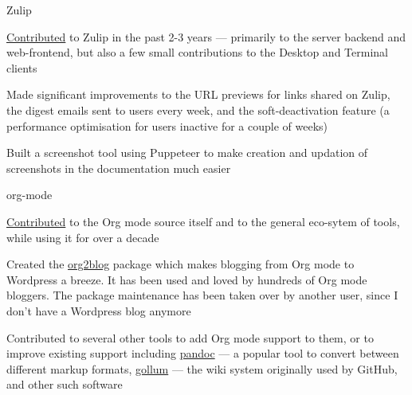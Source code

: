 
\begin{cventries}

  \cventry
      {Zulip }
      {}
      {} %
      {} %
      {
        \begin{cvitems} %
        \item {\href{https://github.com/zulip/zulip/commits?author=punchagan}{Contributed} to Zulip in the past 2-3 years --- primarily to the server backend and web-frontend, but also a few small contributions to the Desktop and Terminal clients}
        \item {Made significant improvements to the URL previews for links shared on Zulip, the digest emails sent to users every week, and the soft-deactivation feature (a performance optimisation for users inactive for a couple of weeks)}
        \item {Built a screenshot tool using Puppeteer to make creation and updation of screenshots in the documentation much easier}
        \end{cvitems}
      }
  \cventry
      {org-mode }
      {}
      {} %
      {} %
      {
        \begin{cvitems} %
        \item{\href{https://github.com/bzg/org-mode/commits?author=punchagan}{Contributed} to the Org mode source itself and to the general eco-sytem of tools, while using it for over a decade}
        \item{Created the \href{https://github.com/org2blog/org2blog/commits?author=punchagan}{org2blog} package which makes blogging from Org mode to Wordpress a breeze. It has been used and loved by hundreds of Org mode bloggers. The package maintenance has been taken over by another user, since I don't have a Wordpress blog anymore}
        \item{Contributed to several other tools to add Org mode support to them, or to improve existing support including \href{https://github.com/jgm/pandoc/commits?author=punchagan}{pandoc} --- a popular tool to convert between different markup formats, \href{https://github.com/gollum/gollum/commits?author=punchagan}{gollum} --- the wiki system originally used by GitHub, and other such software}

\end{cvitems}}
\end{cventries}
